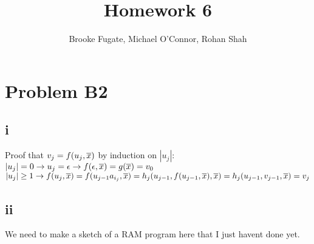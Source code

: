 \documentclass[12pt]{article}
\begin{document}
\pagestyle{plain}
\titleformat{\subsection}[runin]
  {\normalfont\large\bfseries}{\thesubsection}{1em}{}
\titleformat{\subsubsection}[runin]
  {\bfseries}{}{1em}{}

\title{Homework 6}
\author{Brooke Fugate, Michael O'Connor, Rohan Shah}
\date{}

\maketitle

\section*{Problem B2}
\subsection*{i}
Proof that $v_j = f(u_j, \overline{x})$ by induction on $|u_j|$: \newline
$|u_j| = 0 \rightarrow u_j = \epsilon \rightarrow f(\epsilon, \overline{x}) = g(\overline{x}) = v_0$\newline
$|u_j| \ge 1 \rightarrow f(u_j, \overline{x}) = f(u_{j-1}a_{i_j}, \overline{x}) = h_j(u_{j-1}, f(u_{j-1}, \overline{x}), \overline{x}) = h_j(u_{j-1}, v_{j-1}, \overline{x}) = v_j$

\subsection*{ii}
We need to make a sketch of a RAM  program here that I just havent done yet.
\end{document}
